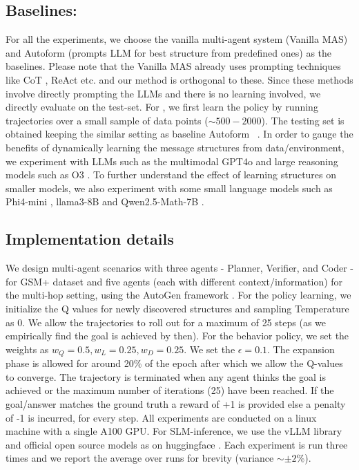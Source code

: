\subsection{Baselines:}
For all the experiments, we choose the vanilla multi-agent system (Vanilla MAS) and Autoform (prompts LLM for best structure from predefined ones) as the baselines. 
Please note that the Vanilla MAS already uses prompting techniques like CoT \cite{cot}, ReAct \cite{react_iclr} etc. and our method is orthogonal to these. 
Since these methods involve directly prompting the LLMs and there is no learning involved, we directly evaluate on the test-set. For \method, we first learn the policy by running trajectories over a small sample of data points ($\sim 500-2000$). The testing set is obtained keeping the similar setting as baseline Autoform ~\cite{chen-etal-2024-beyond-natural}. In order to gauge the benefits of dynamically learning the message structures from data/environment, we experiment with LLMs such as the multimodal GPT4o \cite{openai2024gpt4o} and large reasoning models such as O3 \cite{openai2025competitiveprogramminglargereasoning}. To further understand the effect of learning structures on smaller models, we also experiment with some small language models such as Phi4-mini \cite{phi4technicalreport}, llama3-8B \cite{llama3} and Qwen2.5-Math-7B \cite{qwen2025qwen25technicalreport}.

\subsection{Implementation details}
We design multi-agent scenarios with three agents - Planner, Verifier, and Coder - for GSM+ dataset and five agents (each with different context/information) for the multi-hop setting, using the AutoGen framework \cite{wu2023autogen}. 
For the policy learning, we initialize the Q values for newly discovered structures and sampling Temperature as 0. We allow the trajectories to roll out for a maximum of 25 steps (as we empirically find the goal is achieved by then). For the behavior policy, we set the weights as $w_Q=0.5, w_L=0.25, w_D=0.25$. We set the $\epsilon=0.1$.
The expansion phase is allowed for around 20\% of the epoch after which we allow the Q-values to converge. The trajectory is terminated when any agent thinks the goal is achieved or the maximum number of iterations (25) have been reached. If the goal/answer matches the ground truth a reward of +1 is provided else a penalty of -1 is incurred, for every step.
All experiments are conducted on a linux machine with a single A100 GPU. For SLM-inference, we use the vLLM library \cite{vllm} and official open source models as on huggingface \cite{huggingface}. 
Each experiment is run three times and we report the average over runs for brevity (variance $\sim \pm 2\%$). 

